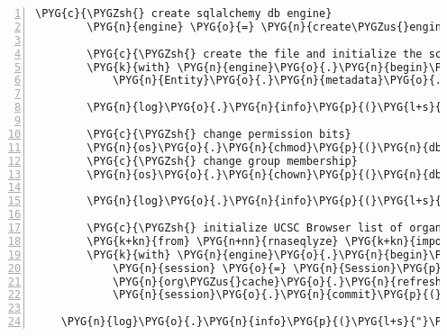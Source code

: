 \begin{Verbatim}[commandchars=\\\{\},numbers=left,firstnumber=1,stepnumber=5]
        \PYG{c}{\PYGZsh{} create sqlalchemy db engine}
        \PYG{n}{engine} \PYG{o}{=} \PYG{n}{create\PYGZus{}engine}\PYG{p}{(}\PYG{n}{rnaseqlyze}\PYG{o}{.}\PYG{n}{db\PYGZus{}url}\PYG{p}{)}

        \PYG{c}{\PYGZsh{} create the file and initialize the schema}
        \PYG{k}{with} \PYG{n}{engine}\PYG{o}{.}\PYG{n}{begin}\PYG{p}{(}\PYG{p}{)} \PYG{k}{as} \PYG{n}{conn}\PYG{p}{:}
            \PYG{n}{Entity}\PYG{o}{.}\PYG{n}{metadata}\PYG{o}{.}\PYG{n}{create\PYGZus{}all}\PYG{p}{(}\PYG{n}{conn}\PYG{p}{)}

        \PYG{n}{log}\PYG{o}{.}\PYG{n}{info}\PYG{p}{(}\PYG{l+s}{"}\PYG{l+s}{adjusting permissions on database file}\PYG{l+s}{"}\PYG{p}{)}

        \PYG{c}{\PYGZsh{} change permission bits}
        \PYG{n}{os}\PYG{o}{.}\PYG{n}{chmod}\PYG{p}{(}\PYG{n}{db\PYGZus{}path}\PYG{p}{,} \PYG{l+m+mo}{0664}\PYG{p}{)}
        \PYG{c}{\PYGZsh{} change group membership}
        \PYG{n}{os}\PYG{o}{.}\PYG{n}{chown}\PYG{p}{(}\PYG{n}{db\PYGZus{}path}\PYG{p}{,} \PYG{o}{-}\PYG{l+m+mi}{1}\PYG{p}{,} \PYG{n}{grp}\PYG{o}{.}\PYG{n}{getgrnam}\PYG{p}{(}\PYG{n}{rnaseqlyze}\PYG{o}{.}\PYG{n}{group}\PYG{p}{)}\PYG{o}{.}\PYG{n}{gr\PYGZus{}gid}\PYG{p}{)}

        \PYG{n}{log}\PYG{o}{.}\PYG{n}{info}\PYG{p}{(}\PYG{l+s}{"}\PYG{l+s}{initializing organism cache}\PYG{l+s}{"}\PYG{p}{)}

        \PYG{c}{\PYGZsh{} initialize UCSC Browser list of organisms}
        \PYG{k+kn}{from} \PYG{n+nn}{rnaseqlyze} \PYG{k+kn}{import} \PYG{n}{org\PYGZus{}cache}
        \PYG{k}{with} \PYG{n}{engine}\PYG{o}{.}\PYG{n}{begin}\PYG{p}{(}\PYG{p}{)} \PYG{k}{as} \PYG{n}{conn}\PYG{p}{:}
            \PYG{n}{session} \PYG{o}{=} \PYG{n}{Session}\PYG{p}{(}\PYG{n}{bind}\PYG{o}{=}\PYG{n}{conn}\PYG{p}{)}
            \PYG{n}{org\PYGZus{}cache}\PYG{o}{.}\PYG{n}{refresh}\PYG{p}{(}\PYG{n}{session}\PYG{p}{)}
            \PYG{n}{session}\PYG{o}{.}\PYG{n}{commit}\PYG{p}{(}\PYG{p}{)}

    \PYG{n}{log}\PYG{o}{.}\PYG{n}{info}\PYG{p}{(}\PYG{l+s}{"}\PYG{l+s}{workdir initialized}\PYG{l+s}{"}\PYG{p}{)}
\end{Verbatim}


